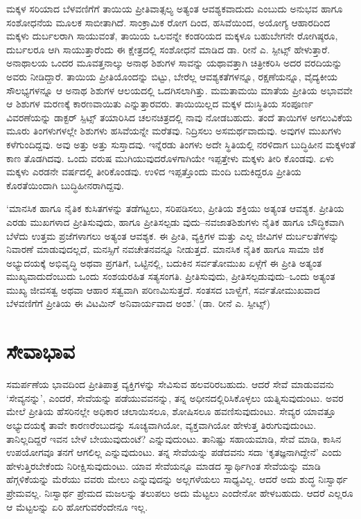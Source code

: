ಮಕ್ಕಳ ಸರಿಯಾದ ಬೆಳವಣಿಗೆಗೆ ತಾಯಿಯ ಪ್ರೀತಿವಾತ್ಸಲ್ಯ ಅತ್ಯಂತ ಆವಶ್ಯಕವಾದುದು ಎಂಬುದು ಅನುಭವ ಹಾಗೂ ಸಂಶೋಧನೆಯ ಮೂಲಕ ಸಾಬೀತಾಗಿದೆ. ಸಾಂಕ್ರಾಮಿಕ ರೋಗ ದಿಂದ, ಹಸಿವೆಯಿಂದ, ಅಯೋಗ್ಯ ಆಹಾರದಿಂದ ಮಕ್ಕಳು ದುರ್ಬಲರಾಗಿ ಸಾಯುವಂತೆ, ತಾಯಿಯ ಒಲವನ್ನೇ ಕಂಡರಿಯದ ಮಕ್ಕಳೂ ಬಹುಬೇಗನೇ ರೋಗಿಷ್ಠರೂ, ದುರ್ಬಲರೂ ಆಗಿ ಸಾಯುತ್ತಾರೆಂದು ಈ ಕ್ಷೇತ್ರದಲ್ಲಿ ಸಂಶೋಧನೆ ಮಾಡಿದ ಡಾ. ರೀನೆ ಎ. ಸ್ಪೀಟ್ಸ್​ ಹೇಳುತ್ತಾರೆ. ಅನಾಥಾಲಯ ಒಂದರ ಮೂವತ್ತನಾಲ್ಕು ಅನಾಥ ಶಿಶುಗಳ ಸಾವನ್ನು ಯಥಾವತ್ತಾಗಿ ಚಿತ್ರೀಕರಿಸಿ ಅದರ ವರದಿಯನ್ನು ಅವರು ನೀಡಿದ್ದಾರೆ. ತಾಯಿಯ ಪ್ರೀತಿಯೊಂದನ್ನು ಬಿಟ್ಟು, ಬೇರೆಲ್ಲ ಆವಶ್ಯಕತೆಗಳನ್ನೂ, ರಕ್ಷಣೆಯನ್ನೂ, ವೈದ್ಯಕೀಯ ಸೌಲಭ್ಯಗಳನ್ನೂ ಆ ಅನಾಥ ಶಿಶುಗಳ ಆಲಯದಲ್ಲಿ ಒದಗಿಸಲಾಗಿತ್ತು. ಮಮತಾಮಯಿ ಮಾತೆಯ ಪ್ರೀತಿಯ ಅಭಾವವೇ ಆ ಶಿಶುಗಳ ಮರಣಕ್ಕೆ ಕಾರಣವಾಯಿತು ಎನ್ನುತ್ತಾರವರು. ತಾಯಿಯಿಲ್ಲದ ಮಕ್ಕಳ ದುಃಸ್ಥಿತಿಯ ಸಂಪೂರ್ಣ ವಿವರಣೆಯನ್ನು ಡಾಕ್ಟರ್ ಸ್ಪಿಟ್ಸ್ ತಯಾರಿಸಿದ ಚಲನಚಿತ್ರದಲ್ಲಿ ನಾವು ನೋಡಬಹುದು. ತಂದೆ ತಾಯಿಗಳ ಅಗಲುವಿಕೆಯ ಮೂರು ತಿಂಗಳುಗಳಲ್ಲೇ ಶಿಶುಗಳು ಹಸಿವೆಯನ್ನೇ ಮರೆತವು. ನಿದ್ರಿಸಲು ಅಸಮರ್ಥವಾದುವು. ಅವುಗಳ ಮುಖಗಳು ಕಳೆಗುಂದಿದ್ದವು. ಅವು ಅತ್ತು ಅತ್ತು ಸುಸ್ತಾದವು. ಇನ್ನೆರಡು ತಿಂಗಳು ಅದೇ ಸ್ಥಿತಿಯಲ್ಲಿ ನರಳಿದಾಗ ಬುದ್ಧಿಹೀನ ಮಕ್ಕಳಂತೆ ಕಾಣ ತೊಡಗಿದವು. ಒಂದು ವರುಷ ಮುಗಿಯುವುದರೊಳಗಾಗಿಯೇ ಇಪ್ಪತ್ತೇಳು ಮಕ್ಕಳು ತೀರಿ ಕೊಂಡವು. ಏಳು ಮಕ್ಕಳು ಎರಡನೇ ವರ್ಷದಲ್ಲಿ ತೀರಿಕೊಂಡವು. ಉಳಿದ ಇಪ್ಪತ್ತೊಂದು ಮಂದಿ ಬದುಕಿದ್ದರೂ ಪ್ರೀತಿಯ ಕೊರತೆಯಿಂದಾಗಿ ಬುದ್ಧಿಹೀನರಾಗಿದ್ದವು.

‘ಮಾನಸಿಕ ಹಾಗೂ ನೈತಿಕ ಕುಸಿತಗಳನ್ನು ತಡೆಗಟ್ಟಲು, ಸರಿಪಡಿಸಲು, ಪ್ರೀತಿಯ ಶಕ್ತಿಯು ಅತ್ಯಂತ ಆವಶ್ಯಕ. ಪ್ರೀತಿಯ ಎರಡು ಮುಖಗಳಾದ ಪ್ರೀತಿಸುವುದು, ಹಾಗೂ ಪ್ರೀತಿಸಲ್ಪಡು ವುದು–ನವಜಾತಶಿಶುಗಳು ನೈತಿಕ ಹಾಗೂ ಬೌದ್ಧಿಕವಾಗಿ ಬೆಳೆದು ಉತ್ತಮ ಪ್ರಜೆಗಳಾಗಲು ಅತ್ಯಂತ ಆವಶ್ಯಕ. ಈ ಪ್ರೀತಿ, ವ್ಯಕ್ತಿಗಳ ಮತ್ತು ಎಲ್ಲ ಜೀವಿಗಳ ದುರ್ಬಲತೆಗಳನ್ನು ನಿವಾರಣೆ ಮಾಡುವುದಲ್ಲದೆ, ಮನಸ್ಸಿಗೆ ನವಚೇತನವನ್ನೂ ನೀಡುತ್ತದೆ. ಮಾನಸಿಕ ನೈತಿಕ ಹಾಗೂ ಸಾಮಾ ಜಿಕ ಅಭ್ಯುದಯಕ್ಕೆ ಅಭಿವೃದ್ಧಿ ಅಥವಾ ಪ್ರಗತಿಗೆ, ಒಟ್ಟಿನಲ್ಲಿ, ಬದುಕಿನ ಸರ್ವತೋಮುಖ ಏಳ್ಗೆಗೆ ಈ ಪ್ರೀತಿ ಅತ್ಯಂತ ಮುಖ್ಯವಾದುದೆಂಬುದು ಒಂದು ಸಂಶಯರಹಿತ ಸತ್ಯಸಂಗತಿ. ಪ್ರೀತಿಸುವುದು, ಪ್ರೀತಿಸಲ್ಪಡುವುದು–ಒಂದು ಅತ್ಯಂತ ಮುಖ್ಯ ಜೀವಸತ್ವ ಅಥವಾ ಆಹಾರ ಸತ್ವವಾಗಿ ಪರಿಣಮಿಸುತ್ತದೆ. ಸಂತಸದ ಬಾಳ್ವೆಗೆ, ಸರ್ವತೋಮುಖವಾದ ಬೆಳವಣಿಗೆಗೆ ಪ್ರೀತಿಯ ಈ ವಿಟಮಿನ್ ಅನಿವಾರ್ಯವಾದ ಅಂಶ.’ (ಡಾ. ರೀನೆ ಎ. ಸ್ಪೀಟ್ಸ್​)


\section{ಸೇವಾಭಾವ}

ಸಮರ್ಪಣೆಯ ಭಾವದಿಂದ ಪ್ರೀತಿಪಾತ್ರ ವ್ಯಕ್ತಿಗಳನ್ನು ಸೇವಿಸುವ ಹಲವರಿರಬಹುದು. ಆದರೆ ಸೇವೆ ಮಾಡುವವನು ‘ಸೇವ್ಯನನ್ನು’, ಎಂದರೆ, ಸೇವೆಯನ್ನು ಪಡೆಯುವವನನ್ನು, ತನ್ನ ಅಧೀನದಲ್ಲಿರಿಸಿಕೊಳ್ಳಲು ಯತ್ನಿಸುವುದುಂಟು. ಅವರ ಮೇಲೆ ಪ್ರೀತಿಯ ಹೆಸರಿನಲ್ಲೇ ಅಧಿಕಾರ ಚಲಾಯಿಸಲೂ, ಶೋಷಿಸಲೂ ಹವಣಿಸುವುದುಂಟು. ಸೇವ್ಯರ ಯಾವತ್ತೂ ಅಭ್ಯುದಯಕ್ಕೆ ತಾವೇ ಕಾರಣರೆಂಬುದನ್ನು ಸೂಚ್ಯವಾಗಿಯೋ, ವ್ಯಕ್ತವಾಗಿಯೋ ಹೇಳುತ್ತ ತಿರುಗುವುದುಂಟು. ತಾನಿಲ್ಲದಿದ್ದರೆ ಇವನ ಬೇಳೆ ಬೇಯುವುದುಂಟೆ? ಎನ್ನುವುದುಂಟು. ತಾನಿಷ್ಟು ಸಹಾಯಮಾಡಿ, ಸೇವೆ ಮಾಡಿ, ಕಾಸಿನ ಉಪಯೋಗವೂ ತನಗೆ ಆಗಲಿಲ್ಲ ಎನ್ನುವುದುಂಟು. ತನ್ನ ಸೇವೆಯನ್ನು ಪಡೆದವನು ಸದಾ ‘ಕೃತಜ್ಞನಾಗಿದ್ದೇನೆ’ ಎಂದು ಹೇಳುತ್ತಿರಬೇಕೆಂದು ನಿರೀಕ್ಷಿಸುವುದುಂಟು. ಯಾವ ಸೇವೆಯನ್ನೂ ಮಾಡದ ಸ್ವಾರ್ಥಿಗಿಂತ ಸೇವೆಯನ್ನು ಮಾಡಿ ಹೆಗ್ಗಳಿಕೆಯನ್ನು ಮೆರೆಯು ವವರು ಮೇಲು ಎನ್ನುವುದನ್ನು ಅಲ್ಲಗಳೆಯಲು ಸಾಧ್ಯವಿಲ್ಲ. ಆದರೆ ಅದು ಶುದ್ಧ ನಿಃಸ್ವಾರ್ಥ ಪ್ರೇಮವಲ್ಲ. ನಿಃಸ್ವಾರ್ಥ ಪ್ರೇಮದ ಮಜಲನ್ನು ತಲುಪಲು ಅದು ಮೆಟ್ಟಲು ಎಂದೇನೋ ಹೇಳಬಹುದು. ಆದರೆ ಎಲ್ಲರೂ ಆ ಮೆಟ್ಟಲನ್ನು ಏರಿ ಹೋಗುವರೆಂದೇನೂ ಇಲ್ಲ.

